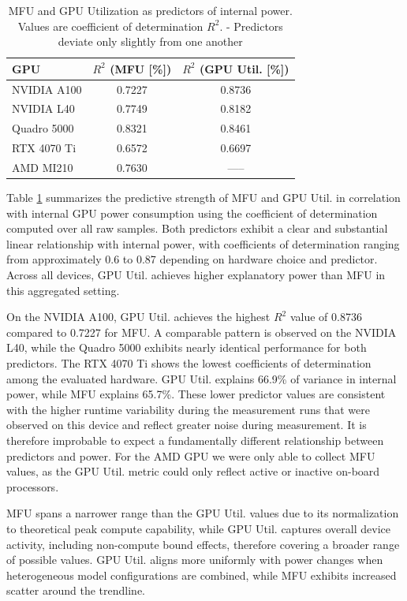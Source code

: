 \documentclass[runningheads]{llncs}
\begin{document}
\begin{table}[t]
    \centering
    \begin{tabular}{lcc}
        \toprule
        \textbf{GPU} & \textbf{$R^2$ (MFU [\%])} & \textbf{$R^2$ (GPU Util. [\%])} \\
        \midrule
        NVIDIA A100   & 0.7227 & 0.8736 \\
        NVIDIA L40    & 0.7749 & 0.8182 \\
        Quadro 5000   & 0.8321 & 0.8461 \\
        RTX 4070 Ti   & 0.6572 & 0.6697 \\
        AMD MI210     & 0.7630 & -----  \\
        \bottomrule
    \end{tabular}
    \caption{MFU and GPU Utilization as predictors of internal power.
           Values are coefficient of determination $R^2$. - Predictors deviate only slightly from one another}
    \label{tab:mfu_gpu_r2}
\end{table}

Table \ref{tab:mfu_gpu_r2} summarizes the predictive strength of MFU and GPU Util. in correlation with internal GPU power consumption using the coefficient of determination computed over all raw samples. Both predictors exhibit a clear and substantial linear relationship with internal power, with coefficients of determination ranging from approximately 0.6 to 0.87 depending on hardware choice and predictor. Across all devices, GPU Util. achieves higher explanatory power than MFU in this aggregated setting.

On the NVIDIA A100, GPU Util. achieves the highest $R^2$ value of 0.8736 compared to 0.7227 for MFU. A comparable pattern is observed on the NVIDIA L40, while the Quadro 5000 exhibits nearly identical performance for both predictors.
The RTX 4070 Ti shows the lowest coefficients of determination among the evaluated hardware. GPU Util. explains 66.9\% of variance in internal power, while MFU explains 65.7\%. These lower predictor values are consistent with the higher runtime variability during the measurement runs that were observed on this device and reflect greater noise during measurement. It is therefore improbable to expect a fundamentally different relationship between predictors and power. For the AMD GPU we were only able to collect MFU values, as the GPU Util. metric could only reflect active or inactive on-board processors.

MFU spans a narrower range than the GPU Util. values due to its normalization to theoretical peak compute capability, while GPU Util. captures overall device activity, including non-compute bound effects, therefore covering a broader range of possible values. GPU Util. aligns more uniformly with power changes when heterogeneous model configurations are combined, while MFU exhibits increased scatter around the trendline.
\end{document}
